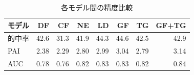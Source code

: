 \begin{table}[htbp]
  \centering
  \caption{各モデル間の精度比較}
  \begin{tabular}{l|r|r|r|r|r|r|r}
  \hline

  モデル & DF & CF & NE & LD & GF & TG & GF+TG \\  \hline\hline
  的中率 & 42.6 & 31.3 & 41.9 & 44.3 & 44.6 & 42.5 & 42.9 \\ 
  PAI & 2.38 & 2.29 & 2.80 & 2.99 & 3.04 & 2.79 & 3.14 \\ 
  AUC & 0.78 & 0.76 & 0.82 & 0.83 & 0.83 & 0.82 & 0.84 \\ \hline
  


  \end{tabular}
  \label{tb:fig:add-crime-timeseries-index}
\end{table}

\FloatBarrier